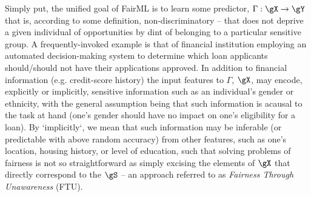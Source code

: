 %

Simply put, the unified goal of FairML is to learn some predictor, \(\Gamma: \gX \to \gY \) that
is, according to some definition, non-discriminatory -- that does not deprive a given individual of
opportunities by dint of belonging to a particular sensitive group.
%
A frequently-invoked example is that of financial institution employing an automated
decision-making system to determine which loan applicants should/should not have their applications
approved.
%
In addition to financial information (e.g. credit-score history) the input features to \(\Gamma\),
\(\gX\), may encode, explicitly or implicitly, sensitive information such as an individual's gender
or ethnicity, with the general assumption being that such information is acausal to the task at
hand (one's gender should have no impact on one's eligibility for a loan).
%
By `implicitly`, we mean that such information may be inferable (or predictable with above random
accuracy) from other features, such as one's location, housing history, or level of education, such
that solving problems of fairness is not so straightforward as simply excising the elements of
\(\gX\) that directly correspond to the \(\gS\) -- an approach referred to as \emph{Fairness
Through Unawareness} (FTU).
%

